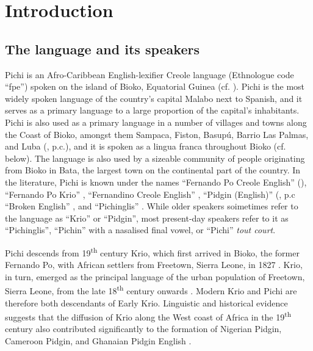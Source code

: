 \chapter{Introduction}
\section{The language and its speakers}\label{sec:1.1}

Pichi is an Afro-Caribbean English-lexifier Creole language (Ethnologue code “fpe”) spoken on the island of Bioko, Equatorial Guinea (cf. ). Pichi is the most widely spoken language of the country’s capital Malabo next to Spanish, and it serves as a primary language to a large proportion of the capital’s inhabitants. Pichi is also used as a primary language in a number of villages and towns along the Coast of Bioko, amongst them Sampaca, Fiston, Basupú, Barrio Las Palmas, and Luba (\citeauthor{MorgadesBesari2005}, p.c.), and it is spoken as a lingua franca throughout Bioko (cf.  below). The language is also used by a sizeable community of people originating from Bioko in Bata, the largest town on the continental part of the country. In the literature, Pichi is known under the names “Fernando Po Creole English” (\citealt{SimonsFennig2017}), “Fernando Po Krio” \citep{Berry1970},  “Fernandino Creole English” \citep{Holm1988}, “Pidgin (English)” (\citeauthor{MorgadesBesari2005}, p.c “Broken English” \citep{Zarco1938}, and “Pichinglis” \citep{Lipski1992}. While older speakers soimetimes refer to the language as “Krio” or “Pidgin”, most present-day speakers refer to it as “Pichinglis”, “Pichin” with a nasalised final vowel, or “Pichi” \textit{tout court}. 


Pichi descends from 19\textsuperscript{th} century Krio, which first arrived in Bioko, the former Fernando Po, with African settlers from Freetown, Sierra Leone, in 1827 \citep[165]{Fyfe1962}. Krio, in turn, emerged as the principal language of the urban population of Freetown, Sierra Leone, from the late 18\textsuperscript{th} century onwards \citep{Huber1999}. Modern Krio and Pichi are therefore both descendants of Early Krio. Linguistic and historical evidence suggests that the diffusion of Krio along the West coast of Africa in the 19\textsuperscript{th} century also contributed significantly to the formation of Nigerian Pidgin, Cameroon Pidgin, and Ghanaian Pidgin English \citep{Huber1999}. 



